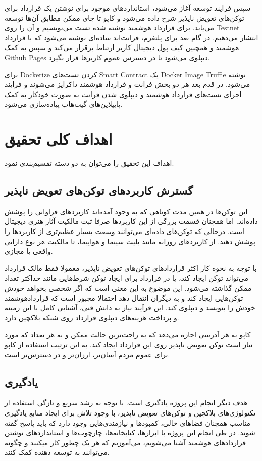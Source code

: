 سپس فرایند توسعه آغاز می‌شود، استاندارد‌های موجود برای نوشتن یک قرارداد برای توکن‌های تعویض ناپذیر شرح داده می‌شود و کاپو تا جای ممکن مطابق آن‌ها توسعه می‌یابد. برای قرارداد هوشمند نوشته شده تست می‌نویسیم و آن را روی
\gls{Testnet}
انتشار می‌دهیم.
در گام بعد برای پلتفرم، فرانت‌اند ساده‌ای نوشته می‌شود که با قرارداد هوشمند و همچنین کیف پول دیجیتال کاربر ارتباط برقرار می‌کند و سپس به کمک
\gls{Github Pages}
دیپلوی می‌شود تا در دسترس عموم کاربرها قرار بگیرد.

برای
\gls{Dockerize}
کردن تست‌های
\gls{Smart Contract}
یک
\gls{Docker Image}
\gls{Truffle}
نوشته می‌شود. در قدم بعد هر دو بخش فرانت و قرارداد هوشمند داکرایز می‌شوند و فرایند اجرای تست‌های قرارداد هوشمند و دیپلوی شدن فرانت به صورت خودکار به کمک پایپلاین‌های گیت‌هاب پیاده‌سازی می‌شود.


\section{اهداف کلی تحقیق}
اهداف این تحقیق را می‌توان به دو دسته تقسیم‌بندی نمود.

\subsection{گسترش کاربرد‌های توکن‌های تعویض ناپذیر}
این توکن‌ها در همین مدت کوتاهی که به وجود آمده‌اند کاربردهای فراوانی را پوشش داده‌اند. اما همچنان قسمت بزرگی از این کاربردها صرفا ثبت مالکیت آثار هنری دیجیتال است. درحالی که توکن‌های داده‌ای می‌توانند وسعت بسیار عظیم‌تری از کاربردها را پوشش دهند. از کاربردهای روزانه مانند بلیت سینما و هواپیما، تا مالکیت هر نوع دارایی واقعی یا مجازی.

با توجه به نحوه کار اکثر قراردادهای توکن‌های تعویض ناپذیر، معمولا فقط مالک قرارداد می‌تواند توکن ایجاد کند، یا در قرارداد برای ایجاد توکن شرط‌هایی مانند حداکثر تعداد ممکن گذاشته می‌شود. این موضوع به این معنی است که اگر شخصی بخواهد خودش توکن‌هایی ایجاد کند و به دیگران انتقال دهد احتمالا مجبور است که قراردادهوشمند خودش را بنویسد و دیپلوی کند. این فرآیند نیاز به دانش فنی، آشنایی کامل با این زمینه و پرداخت هزینه‌های دیپلوی قرارداد روی شبکه بلاکچین دارد.

کاپو به هر آدرسی اجازه می‌دهد که به راحت‌ترین حالت ممکن و به هر تعداد که مورد نیاز است توکن تعویض ناپذیر روی این قرارداد ایجاد کند. به این ترتیب استفاده از کاپو برای عموم مردم آسان‌تر، ارزان‌تر و در دسترس‌تر است.

\subsection{یادگیری}
هدف دیگر انجام این پروژه یادگیری است. با توجه به رشد سریع و تازگی استفاده از تکنولوژی‌های بلاکچین و توکن‌های تعویض ناپذیر، با وجود تلاش برای ایجاد منابع یادگیری مناسب همچنان فضاهای خالی، کمبودها و نیازمندی‌هایی وجود دارد که باید پاسخ گفته شوند. در طی انجام این پروژه با ابزارها، کتابخانه‌ها، چارچوب‌ها و استانداردهای نوشتن قراردادهای هوشمند آشنا می‌شویم، می‌آموزیم که هر یک چطور کار میکنند و چگونه می‌توانند به توسعه دهنده کمک کنند.

